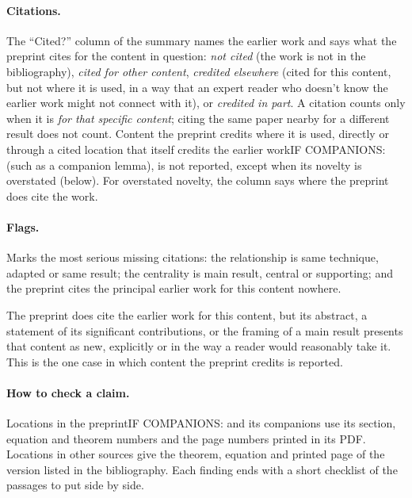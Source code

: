 \paragraph{Citations.}
The ``Cited?'' column of the summary names the earlier work and says what the
preprint cites for the content in question: \emph{not cited} (the work is not
in the bibliography), \emph{cited for other content}, \emph{credited elsewhere}
(cited for this content, but not where it is used,
in a way that an expert reader who doesn't know the earlier work might not connect with it), or \emph{credited in
part}. A citation counts only when it is \emph{for that specific content};
citing the same paper nearby for a different result does not count. Content
the preprint credits where it is used, directly or through a cited location
that itself credits the earlier work{IF COMPANIONS: (such as a companion
lemma)}, is not reported, except when its novelty is overstated (below). For
overstated novelty, the column says where the preprint does cite the work.

\paragraph{Flags.}
\begin{description}[leftmargin=1.5em,font=\normalfont\bfseries]
\item[Attribution gap.] Marks the most serious missing citations: the
relationship is same technique, adapted or same result; the centrality is main
result, central or supporting; and the preprint cites the principal earlier
work for this content nowhere.
\item[Overstated novelty.] The preprint does cite the earlier work for this
content, but its abstract, a statement of its significant contributions, or the framing of
a main result presents that content as new, explicitly or in the way a reader
would reasonably take it. This is the one case in which content the preprint
credits is reported.
\end{description}

\paragraph{How to check a claim.}
Locations in the preprint{IF COMPANIONS: and its companions} use its section,
equation and theorem numbers and the page numbers printed in its PDF.
Locations in other sources give the theorem, equation and printed page of the
version listed in the bibliography. Each finding ends with a short checklist
of the passages to put side by side.

